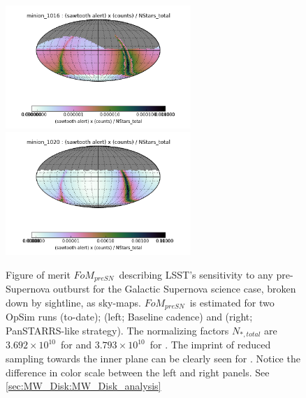 \begin{figure}
\begin{center}
  \includegraphics[width=7cm]{./figs/milkyway/galacticSN_SkyMap_Baseline.png}
  \includegraphics[width=7cm]{./figs/milkyway/galacticSN_SkyMap_PanSTARRS.png}
  \caption{Figure of merit $FoM_{preSN}$~describing LSST's sensitivity
  to any pre-Supernova outburst for the Galactic Supernova science case,
  broken down by sightline, as sky-maps. $FoM_{preSN}$~is estimated for
  two OpSim runs (to-date);  (left; Baseline
  cadence) and  (right; PanSTARRS-like
  strategy). The normalizing factors $N_{\ast, total}$ are $3.692\times
  10^{10}$~for  and $3.793 \times 10^{10}$~for
  . The imprint of reduced sampling towards
  the inner plane can be clearly seen for .
  Notice the difference in color scale between the left and right
  panels. See \autoref{sec:MW_Disk:MW_Disk_analysis}}
\label{f_opSim_GalacticSN}
\end{center}
\end{figure}






